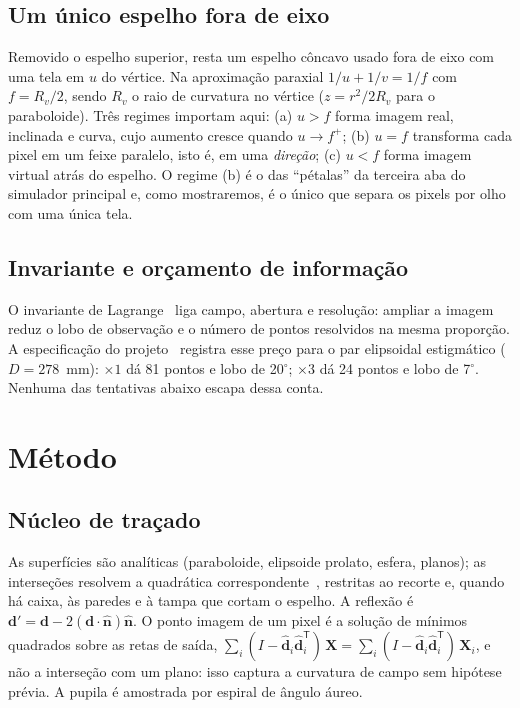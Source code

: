 \documentclass[journal,10pt]{IEEEtran}
\begin{document}
\subsection{Um \'unico espelho fora de eixo}
Removido o espelho superior, resta um espelho c\^oncavo usado fora de eixo com uma tela em $u$ do v\'ertice. Na aproxima\c{c}\~ao paraxial $1/u + 1/v = 1/f$ com $f = R_v/2$, sendo $R_v$ o raio de curvatura no v\'ertice ($z = r^2/2R_v$ para o paraboloide). Tr\^es regimes importam aqui: (a) $u > f$ forma imagem real, inclinada e curva, cujo aumento cresce quando $u \to f^{+}$; (b) $u = f$ transforma cada pixel em um feixe paralelo, isto \'e, em uma \emph{dire\c{c}\~ao}; (c) $u < f$ forma imagem virtual atr\'as do espelho. O regime (b) \'e o das ``p\'etalas'' da terceira aba do simulador principal e, como mostraremos, \'e o \'unico que separa os pixels por olho com uma \'unica tela.

\subsection{Invariante e or\c{c}amento de informa\c{c}\~ao}
O invariante de Lagrange~\cite{hecht2017} liga campo, abertura e resolu\c{c}\~ao: ampliar a imagem reduz o lobo de observa\c{c}\~ao e o n\'umero de pontos resolvidos na mesma propor\c{c}\~ao. A especifica\c{c}\~ao do projeto~\cite{holosion2026} registra esse pre\c{c}o para o par elipsoidal estigm\'atico ($D = 278$~mm): $\times1$ d\'a 81 pontos e lobo de 20$^\circ$; $\times3$ d\'a 24 pontos e lobo de 7$^\circ$. Nenhuma das tentativas abaixo escapa dessa conta.

\section{M\'etodo}
\subsection{N\'ucleo de tra\c{c}ado}
As superf\'icies s\~ao anal\'iticas (paraboloide, elipsoide prolato, esfera, planos); as interse\c{c}\~oes resolvem a quadr\'atica correspondente~\cite{spencer1962}, restritas ao recorte e, quando h\'a caixa, \`as paredes e \`a tampa que cortam o espelho. A reflex\~ao \'e $\mathbf d' = \mathbf d - 2(\mathbf d\cdot\hat{\mathbf n})\hat{\mathbf n}$. O ponto imagem de um pixel \'e a solu\c{c}\~ao de m\'inimos quadrados sobre as retas de sa\'ida, $\sum_i (I - \hat{\mathbf d}_i\hat{\mathbf d}_i^{\mathsf T})\,\mathbf X = \sum_i (I - \hat{\mathbf d}_i\hat{\mathbf d}_i^{\mathsf T})\,\mathbf X_i$, e n\~ao a interse\c{c}\~ao com um plano: isso captura a curvatura de campo sem hip\'otese pr\'evia. A pupila \'e amostrada por espiral de \^angulo \'aureo.
\end{document}

